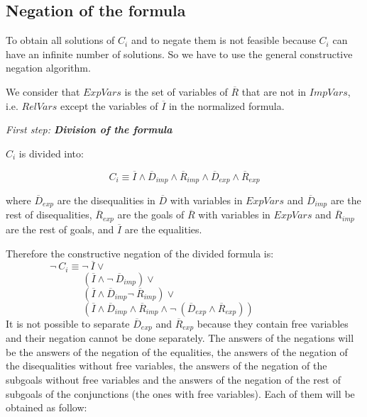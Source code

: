 \documentclass{llncs}
\begin{document}
 


\subsection{Negation of the formula}
\label{negation}

To obtain all solutions of $C_i$ and to negate them is not feasible
because $C_i$ can have an infinite number of solutions. So we have to
use the general constructive negation algorithm.  

We consider that $ExpVars$ is the set of variables of $\overline{R}$
that are not in $ImpVars$, i.e. $RelVars$ except the variables of
$\overline{I}$ in the normalized formula.
\medskip

\noindent
{\em First step: {\bf Division of the formula}}

\noindent
$C_i$ is divided into:

\[C_i \equiv \overline{I} \wedge
        \overline{D}_{imp} \wedge \overline{R}_{imp} \wedge
        \overline{D}_{exp} \wedge \overline{R}_{exp} \]

\noindent
where $\overline{D}_{exp}$ are the disequalities in $\overline{D}$
with variables in $ExpVars$ and $\overline{D}_{imp}$ are the rest of
disequalities, $\overline{R}_{exp}$ are the goals of $\overline{R}$
with variables in $ExpVars$ and $\overline{R}_{imp}$ are the rest of
goals, and $\overline{I}$ are the equalities.

Therefore the constructive negation of the divided formula is: \\

$~~~~~~~~~~~~~~~~~~~~\neg~C_i \equiv \neg~\overline{I} \vee $ \\
$~~~~~~~~~~~~~~~~~~~~~~~~~~~~~~~~~~~(\overline{I} \wedge \neg~\overline{D}_{imp}) \vee  $ \\
$~~~~~~~~~~~~~~~~~~~~~~~~~~~~~~~~~~~(\overline{I} \wedge \overline{D}_{imp} \neg~\overline{R}_{imp}) \vee $ \\
$~~~~~~~~~~~~~~~~~~~~~~~~~~~~~~~~~~~( \overline{I} \wedge \overline{D}_{imp} \wedge \overline{R}_{imp} \wedge \neg~(\overline{D}_{exp} \wedge \overline{R}_{exp})) $ \\

\noindent
It is not possible to separate $\overline{D}_{exp}$ and
$\overline{R}_{exp}$ because they contain free variables and
their negation cannot be done separately. The answers of the negations
will be the answers of the negation of the equalities, the answers of
the negation of the disequalities without free variables, the answers
of the negation of the subgoals without free variables and the answers
of the negation of the rest of subgoals of the conjunctions (the ones
with free variables). Each of them will be obtained as follow:
\medskip
\end{document}
